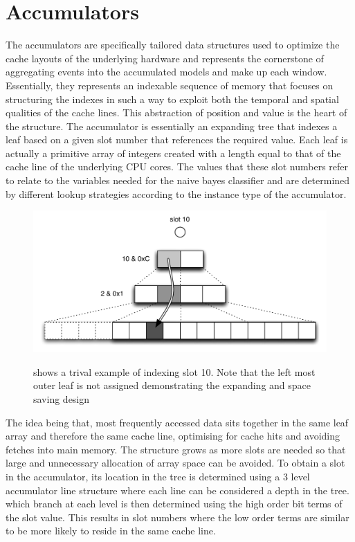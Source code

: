 \documentclass[a4paper,11pt]{scrreprt}
\begin{document}
\section{Accumulators}
The accumulators are specifically tailored data structures used to optimize the cache layouts of the underlying hardware and represents the cornerstone of aggregating events into the accumulated models and make up each window. Essentially, they represents an indexable sequence of memory that focuses on structuring the indexes in such a way to exploit both the temporal and spatial qualities of the cache lines. This abstraction of position and value is the heart of the structure. The accumulator is essentially an expanding tree that indexes a leaf based on a given slot number that references the required value. Each leaf is actually a primitive array of integers created with a length equal to that of the cache line of the underlying CPU cores. The values that these slot numbers refer to relate to the variables needed for the naive bayes classifier and are determined by different lookup strategies according to the instance type of the accumulator. \\
\begin{figure}[h!]
\centering
\caption{shows a trival example of indexing slot 10. Note that the left most outer leaf is not assigned demonstrating the expanding and space saving design}
\includegraphics[scale=0.72, trim=0 0 0 12, clip=true] {accumulator-lookup.pdf}
\label{fig:accumulator-lookup}
\end{figure}

The idea being that, most frequently accessed data sits together in the same leaf array and therefore the same cache line, optimising for cache hits and avoiding fetches into main memory. The structure grows as more slots are needed so that large and unnecessary allocation of array space can be avoided. To obtain a slot in the accumulator, its location in the tree is determined using a 3 level accumulator line structure where each line can be considered a depth in the tree. which branch at each level is then determined using the high order bit terms of the slot value. This results in slot numbers where the low order terms are similar to be more likely to reside in the same cache line.
\end{document}
